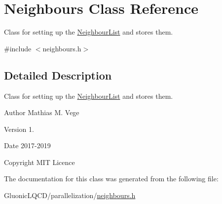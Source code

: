 \hypertarget{class_neighbours}{}\section{Neighbours Class Reference}
\label{class_neighbours}


Class for setting up the \mbox{\hyperlink{struct_neighbour_list}{Neighbour\+List}} and stores them.  




{\ttfamily \#include $<$neighbours.\+h$>$}



\subsection{Detailed Description}
Class for setting up the \mbox{\hyperlink{struct_neighbour_list}{Neighbour\+List}} and stores them. 

\begin{DoxyAuthor}{Author}
Mathias M. Vege 
\end{DoxyAuthor}
\begin{DoxyVersion}{Version}
1. 
\end{DoxyVersion}
\begin{DoxyDate}{Date}
2017-\/2019 
\end{DoxyDate}
\begin{DoxyCopyright}{Copyright}
M\+IT Licence 
\end{DoxyCopyright}


The documentation for this class was generated from the following file\+:\begin{DoxyCompactItemize}
\item 
Gluonic\+L\+Q\+C\+D/parallelization/\mbox{\hyperlink{neighbours_8h}{neighbours.\+h}}\end{DoxyCompactItemize}
